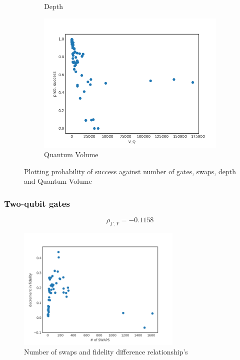 \documentclass[11pt]{article}
\begin{document}
\begin{figure}[H]
\begin{subfigure}[b]{0.5\linewidth}
    \caption{Depth} 
    \label{fig:ps_d_3000} 
  \end{subfigure}%
  \begin{subfigure}[b]{0.5\linewidth}
    \centering
    \includegraphics[width=0.75\linewidth]{ps_q_3000} 
    \caption{Quantum Volume} 
    \label{fig:ps_q_3000} 
  \end{subfigure} 
  \caption{Plotting probability of success against number of gates, swaps, depth and Quantum Volume}
  \label{fig:ps_3000} 
\end{figure}




\subsubsection{Two-qubit gates}
\label{sec:org6069832}

$$\rho _{f',Y} = -0.1158$$

\begin{figure}[htbp]
\centering
\includegraphics[width=0.7\textwidth]{f_s_2qg_3000.png}
\caption{\label{fig:orgee5301d}
Number of swaps and fidelity difference relationship's}
\end{figure}
\end{document}
